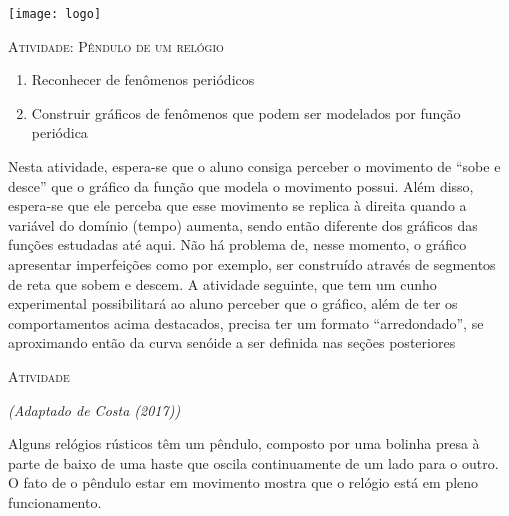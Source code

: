 \documentclass[10 pt,usenames,dvipsnames, oneside]{article}
\begin{document}
\begin{center}
  \begin{minipage}[l]{3cm}
\texttt{[image: logo]}    
\end{minipage}\hfill
\begin{minipage}[r]{.8\textwidth}
 {\Large \scshape Atividade: Pêndulo de um relógio}  
\end{minipage}
\end{center}
\vspace{.2cm}

\ifdefined\prof

\begin{goals}
\begin{enumerate}
\item Reconhecer de fenômenos periódicos
\item Construir gráficos de fenômenos que podem ser modelados
por função periódica
\end{enumerate}

\tcblower

Nesta atividade, espera-se que o aluno consiga perceber o
movimento de “sobe e desce”{} que o gráfico da função que
modela o movimento possui. Além disso, espera-se que ele
perceba que esse movimento se replica à direita quando a
variável do domínio (tempo) aumenta, sendo então diferente
dos gráficos das funções estudadas até aqui. Não há problema
de, nesse momento, o gráfico apresentar imperfeições como
por exemplo, ser construído através de segmentos de reta que
sobem e descem. A atividade seguinte, que tem um cunho
experimental possibilitará ao aluno perceber que o gráfico,
além de ter os comportamentos acima destacados, precisa ter
um formato “arredondado”, se aproximando então da curva
senóide a ser definida nas seções posteriores
\end{goals}

\bigskip
\begin{center}
{\large \scshape Atividade}
\end{center}
\fi

\textit{(Adaptado de Costa (2017))}
\label{trig-ativ1}

Alguns relógios rústicos têm um pêndulo, composto por uma bolinha presa à parte de baixo de uma haste que oscila continuamente de um lado para o outro. O fato de o pêndulo estar em movimento mostra que o relógio está em pleno funcionamento.
\end{document}
